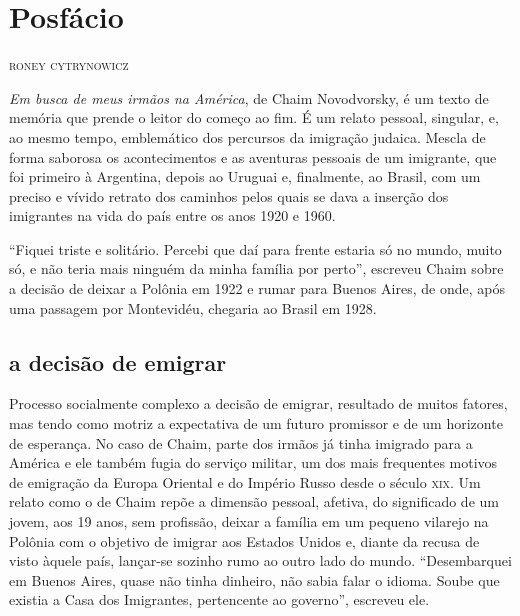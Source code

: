 \chapter*{Posfácio\smallskip{}}

\begin{flushright}
\textsc{roney cytrynowicz}
\end{flushright}\medskip

\noindent{}\textit{Em busca de meus irmãos na América}, de Chaim
Novodvorsky, é um texto de memória que prende o leitor do começo ao fim.
É um relato pessoal, singular, e, ao mesmo tempo, emblemático dos
percursos da imigração judaica. Mescla de forma saborosa os
acontecimentos e as aventuras pessoais de um imigrante, que foi primeiro
à Argentina, depois ao Uruguai e, finalmente, ao Brasil, com um preciso
e vívido retrato dos caminhos pelos quais se dava a inserção dos
imigrantes na vida do país entre os anos 1920 e 1960.

``Fiquei triste e solitário. Percebi que daí para frente estaria
só no mundo, muito só, e não teria mais ninguém da minha família por perto'', escreveu Chaim sobre a decisão de deixar a
Polônia em 1922 e rumar para Buenos Aires, de onde, após uma passagem
por Montevidéu, chegaria ao Brasil em 1928. 

\section{a decisão de emigrar}

Processo socialmente complexo a decisão de emigrar, resultado de muitos fatores, mas tendo
como motriz a expectativa de um futuro promissor e de um horizonte de
esperança. No caso de Chaim, parte dos irmãos já tinha imigrado para a
América e ele também fugia do serviço militar, um dos mais frequentes
motivos de emigração da Europa Oriental e do Império Russo desde o
século \textsc{xix}. Um relato como o de Chaim repõe a dimensão pessoal, afetiva, do
significado de um jovem, aos 19 anos, sem profissão, deixar a família em
um pequeno vilarejo na Polônia com o objetivo de imigrar aos Estados
Unidos e, diante da recusa de visto àquele país, lançar-se sozinho rumo
ao outro lado do mundo. ``Desembarquei em Buenos Aires, quase não tinha
dinheiro, não sabia falar o idioma. Soube que existia a Casa dos
Imigrantes, pertencente ao governo'', escreveu ele.

